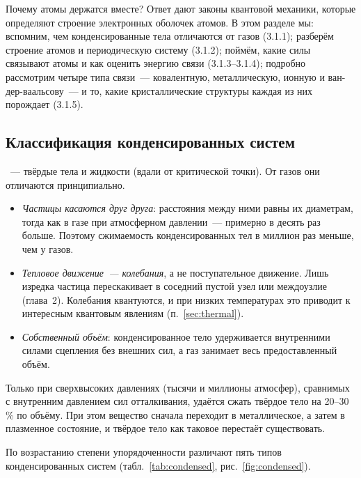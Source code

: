 \begin{orientir}
Почему атомы держатся вместе? Ответ дают законы квантовой механики,
которые определяют строение электронных оболочек атомов. В этом разделе
мы: вспомним, чем конденсированные тела отличаются от газов (3.1.1);
разберём строение атомов и периодическую систему (3.1.2); поймём,
какие силы связывают атомы и как оценить энергию связи (3.1.3--3.1.4);
подробно рассмотрим четыре типа связи~— ковалентную, металлическую,
ионную и ван-дер-ваальсову~— и то, какие кристаллические структуры
каждая из них порождает (3.1.5).
\end{orientir}

\subsection{Классификация конденсированных систем}\label{ssec:condensed}

~— твёрдые тела и жидкости (вдали от
критической точки). От газов они отличаются принципиально.
\begin{itemize}
\item \emph{Частицы касаются друг друга}: расстояния между ними равны их
диаметрам, тогда как в газе при атмосферном давлении~— примерно в десять
раз больше. Поэтому сжимаемость конденсированных тел в миллион раз меньше,
чем у газов.
\item \emph{Тепловое движение~— колебания}, а не поступательное движение.
Лишь изредка частица перескакивает в соседний пустой узел или междоузлие
(глава~2). Колебания квантуются, и при низких температурах это приводит к
интересным квантовым явлениям (п.~\ref{sec:thermal}).
\item \emph{Собственный объём}: конденсированное тело удерживается
внутренними силами сцепления без внешних сил, а газ занимает весь
предоставленный объём.
\end{itemize}

Только при сверхвысоких давлениях (тысячи и миллионы атмосфер),
сравнимых с внутренним давлением сил отталкивания, удаётся сжать твёрдое
тело на 20--30\,\% по объёму. При этом вещество сначала переходит в
металлическое, а затем в плазменное состояние, и твёрдое тело как
таковое перестаёт существовать.

По возрастанию степени упорядоченности различают пять типов
конденсированных систем (табл.~\ref{tab:condensed}, рис.~\ref{fig:condensed}).

